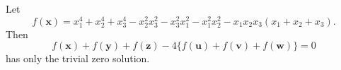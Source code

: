 \begin{proposition}
    Let
\[
    f(\mathbf{x})=x_1^4+x_2^4+x_3^4-x_2^2x_3^2-x_3^2x_1^2-x_1^2x_2^2-x_1x_2x_3(x_1+x_2+x_3).
\]
    Then
\[
    f(\mathbf{x})+f(\mathbf{y})+f(\mathbf{z})-4\{f(\mathbf{u})+f(\mathbf{v})+f(\mathbf{w})\}=0
\]
    has only the trivial zero solution.
\end{proposition}
